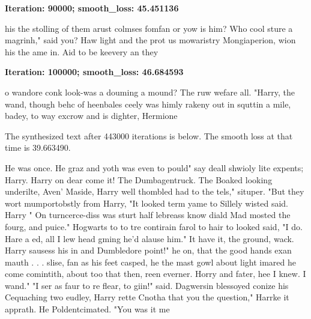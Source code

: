 \documentclass[12pt]{article}
\newenvironment{question}[2][Question]{\begin{trivlist}
\kern10pt
\item[\hskip \labelsep {\bfseries #1}\hskip \labelsep {\bfseries #2.}]}{\end{trivlist}}
\begin{document}
\begin{question}{iii}
\textbf{Iteration: 90000; smooth\_loss: 45.451136}

 his the stolling of them arust colmses fomfan or yow is him?  Who cool sture a magrinh," said you?  Haw light and the prot us mowaristry Mongiaperion, wion his the ame in.  Aid to be keevery an they 


\textbf{Iteration: 100000; smooth\_loss: 46.684593} 

o wandore conk look-was a douming a mound?  The ruw wefare all.  "Harry, the wand, though behc of heenbales ceely was himly rakeny out in squttin a mile, badey, to way excrow and is dighter, Hermione 

\end{question}

\begin{question}{iv}
The synthesized text after 443000 iterations is below. The smooth loss at that time is 39.663490.

He was once.  He graz and yoth was even to pould"  say deall shwioly lite expents; Harry. Harry on dear come it!  The Dumbagentruck.  The Boaked looking underilte, Aven' Maside, Harry well thombled had to the tels," situper.
"But they wort mumportobstly from Harry, "It looked term yame to Sillely wisted said.  Harry "
On turncerce-diss was sturt half lebreass know diald Mad mosted the fourg, and puice."
Hogwarts to to tre contirain farol to hair to looked said, "I do. Hare a ed, all I lew head gming he'd alause him."
It have it, the ground, wack.  Harry sausess his in and Dumbledore point!"  he on, that the good hands exan mauth . . . slise, fan as his feet casped, he the mast gowl about light imared he come comintith, about too that then, reen everner.  Horry and fater, hee I knew.  I wand."
"I ser as faur to re flear, to giin!" said.
Dagwersin blessoyed conize his Cequaching two eudley,
Harry rette Cnotha that you the question,"
Harrke it apprath.  He Poldentcimated.
"You was it me

\end{question}
\end{document}
